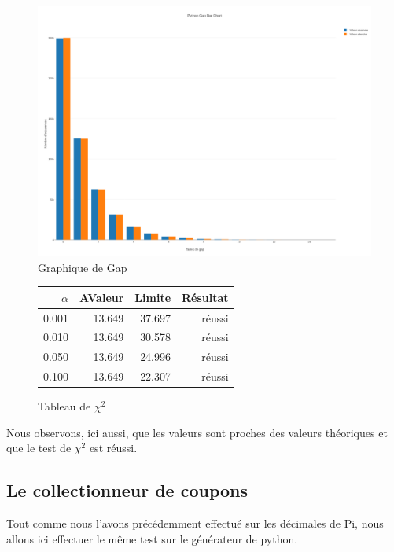 \documentclass[10pt,a4paper]{article}
\begin{document}
\begin{figure}[h]
\centering
\includegraphics[scale=0.20]{../chart_images/python_gap_bar_chart.png}
\caption{Graphique de Gap}
\end{figure}

\begin{figure}[h]
	\centering
	\begin{tabular}{|r|r|r|r|}
		\hline
		$\alpha$ & AValeur & Limite & Résultat\\
		\hline
		0.001 & 13.649 & 37.697 & réussi\\
		0.010 & 13.649 & 30.578 & réussi\\
		0.050 & 13.649 & 24.996 & réussi\\
		0.100 & 13.649 & 22.307 & réussi\\
		\hline
	\end{tabular}
	\caption{Tableau de $\chi^2$}
\end{figure}


\newpage

Nous observons, ici aussi, que les valeurs sont proches des valeurs théoriques et que le test de $\chi^2$  est réussi.

\newpage

\subsection{Le collectionneur de coupons}

Tout comme nous l'avons précédemment effectué sur les décimales de Pi, nous allons ici effectuer le même test sur le générateur de python.
\end{document}
